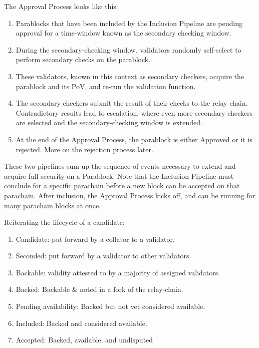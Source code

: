 The Approval Process looks like this:

\begin{enumerate}
    \item Parablocks that have been included by the Inclusion Pipeline are pending approval for a time-window known as the secondary checking window.
    \item During the secondary-checking window, validators randomly self-select to perform secondary checks on the parablock.
    \item These validators, known in this context as secondary checkers, acquire the parablock and its PoV, and re-run the validation function.
    \item The secondary checkers submit the result of their checks to the relay chain. Contradictory results lead to escalation, where even more secondary checkers are selected and the secondary-checking window is extended.
    \item At the end of the Approval Process, the parablock is either Approved or it is rejected. More on the rejection process later.
\end{enumerate}

These two pipelines sum up the sequence of events necessary to extend and acquire full security on a Parablock. Note that the Inclusion Pipeline must conclude for a specific parachain before a new block can be accepted on that parachain. After inclusion, the Approval Process kicks off, and can be running for many parachain blocks at once.

Reiterating the lifecycle of a candidate:

\begin{enumerate}
    \item Candidate: put forward by a collator to a validator.
    \item Seconded: put forward by a validator to other validators.
    \item Backable: validity attested to by a majority of assigned validators.
    \item Backed: Backable & noted in a fork of the relay-chain.
    \item Pending availability: Backed but not yet considered available.
    \item Included: Backed and considered available.
    \item Accepted: Backed, available, and undisputed
\end{enumerate}


